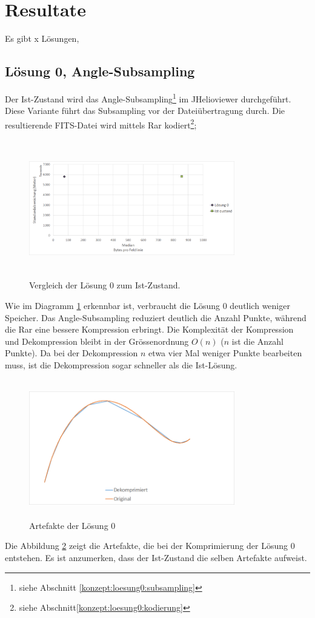 \section{Resultate}\label{resultate}
Es gibt x Lösungen,

\subsection{Lösung 0, Angle-Subsampling} \label{resultate:loesung0}
Der Ist-Zustand wird das Angle-Subsampling\footnote{siehe Abschnitt \ref{konzept:loesung0:subsampling}} im JHelioviewer durchgeführt. Diese Variante führt das Subsampling vor der Dateiübertragung durch. Die resultierende FITS-Datei wird mittels Rar kodiert\footnote{siehe Abschnitt\ref{konzept:loesung0:kodierung}};
\begin{figure}[!htbp]
	\center
	\includegraphics[width=0.8\textwidth,height=6cm,keepaspectratio]{./pictures/resultate/loesung0/loesung0_0.png}
	\caption{Vergleich der Lösung 0 zum Ist-Zustand.}
	\label{resultate:loesung0:loesung0_0}
\end{figure}
Wie im Diagramm \ref{resultate:loesung0:loesung0_0} erkennbar ist, verbraucht die Lösung 0 deutlich weniger Speicher. Das Angle-Subsampling reduziert deutlich die Anzahl Punkte, während die Rar eine bessere Kompression erbringt. Die Komplexität der Kompression und Dekompression bleibt in der Grössenordnung $O(n)$ ($n$ ist die Anzahl Punkte). Da bei der Dekompression $n$ etwa vier Mal weniger Punkte bearbeiten muss, ist die Dekompression sogar schneller als die Ist-Lösung.\\
\begin{figure}[!htbp]
	\center
	\includegraphics[width=0.8\textwidth,height=6cm,keepaspectratio]{./pictures/resultate/loesung0/loesung0_artefakte.png}
	\caption{Artefakte der Lösung 0}
	\label{resultate:loesung0:artefakte}
\end{figure}
Die Abbildung \ref{resultate:loesung0:artefakte} zeigt die Artefakte, die bei der Komprimierung der Lösung 0 entstehen. Es ist anzumerken, dass der Ist-Zustand die selben Artefakte aufweist.

